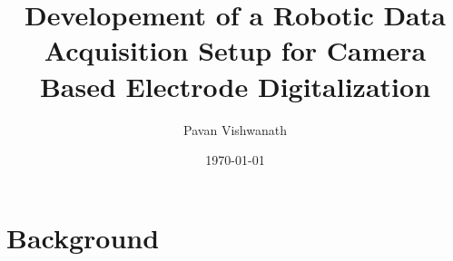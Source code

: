 \documentclass[a4paper, twoside, BCOR=20mm,DIV=13,grayscalebody,toc=bibliography,numbers=noenddot, abstract=true, openany]{mtecreprt}
\author{Pavan Vishwanath}
\title{Developement of a Robotic Data Acquisition Setup for Camera Based Electrode Digitalization}
\date{\today}
\begin{document}
\frontmatter
\maketitle
%
\mainmatter
%
\chapter{Background}

%
%
%
%
%
%
%
%
\backmatter
\printbibliography

\end{document}

